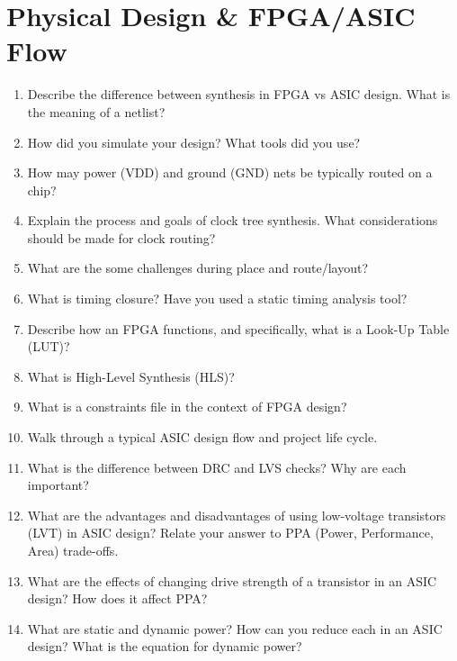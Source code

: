 \documentclass[11pt]{article}
\begin{document}
\section{Physical Design \& FPGA/ASIC Flow}
\begin{enumerate}
    \item Describe the difference between synthesis in FPGA vs ASIC design.
    What is the meaning of a netlist?
    \item How did you simulate your design? What tools did you use?
    \item How may power (VDD) and ground (GND) nets be typically routed on a
    chip?
    \item Explain the process and goals of clock tree synthesis. What
    considerations should be made for clock routing?
    \item What are the some challenges during place and route/layout?
    \item What is timing closure? Have you used a static timing analysis tool?
    \item Describe how an FPGA functions, and specifically, what is a Look-Up
    Table (LUT)?
    \item What is High-Level Synthesis (HLS)?
    \item What is a constraints file in the context of FPGA design?
    \item Walk through a typical ASIC design flow and project life cycle.
    \item What is the difference between DRC and LVS checks? Why are each important?
    \item What are the advantages and disadvantages of using low-voltage
    transistors (LVT) in ASIC design? Relate your answer to PPA (Power,
    Performance, Area) trade-offs.
    \item What are the effects of changing drive strength of a transistor in an
    ASIC design? How does it affect PPA?
    \item What are static and dynamic power? How can you reduce each in an ASIC
    design? What is the equation for dynamic power?
\end{enumerate}

\end{document}
